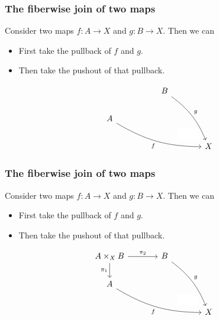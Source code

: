 \documentclass[handout]{beamer}
\newcommand{\inr}{\mathsf{inr}}
\newcommand{\inl}{\mathsf{inl}}
\begin{document}
\begin{frame}
  \frametitle{The fiberwise join of two maps}
  Consider two maps $f:A\to X$ and $g:B\to X$. Then we can
  \begin{itemize}
  \item First take the pullback of $f$ and $g$.
  \item Then take the pushout of that pullback.
  \end{itemize}

  \begin{equation*}
    \begin{tikzcd}[ampersand replacement=\&]
      \phantom{A\times_X B} \arrow[d,phantom,swap,"\phantom{\pi_1}"] \arrow[r,phantom,"\phantom{\pi_2}"] \& B \arrow[d,phantom,"\phantom{\inr}"] \arrow[ddr,bend left=15,"g"] \\
      A \arrow[r,phantom,"\phantom{\inl}"] \arrow[drr,bend right=15,swap,"f"] \& \phantom{A\ast_X B} \arrow[dr,phantom,"\phantom{f\ast g}" description] \\
      \& \& X
    \end{tikzcd}
  \end{equation*}
\end{frame}

\begin{frame}
  \frametitle{The fiberwise join of two maps}
  Consider two maps $f:A\to X$ and $g:B\to X$. Then we can
  \begin{itemize}
  \item First take the pullback of $f$ and $g$.
  \item Then take the pushout of that pullback.
  \end{itemize}

  \begin{equation*}
    \begin{tikzcd}[ampersand replacement=\&]
      A\times_X B \arrow[d,swap,"\pi_1"] \arrow[r,"\pi_2"] \& B \arrow[d,phantom,"\phantom{\inr}"] \arrow[ddr,bend left=15,"g"] \\
      A \arrow[r,phantom,"\phantom{\inl}"] \arrow[drr,bend right=15,swap,"f"] \& \phantom{A\ast_X B} \arrow[dr,phantom,"\phantom{f\ast g}" description] \\
      \& \& X
    \end{tikzcd}
  \end{equation*}
\end{frame}
\end{document}
